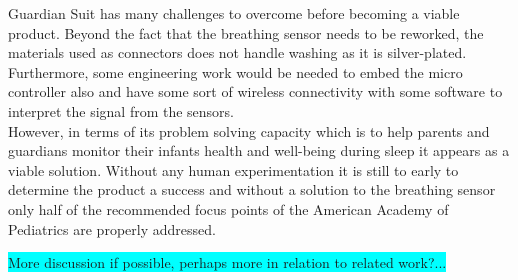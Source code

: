 \documentclass{sigchi-ext}
\begin{document}
Guardian Suit has many challenges to overcome before becoming a viable product. Beyond the fact that the breathing sensor needs
to be reworked, the materials used as connectors does not handle washing as it is silver-plated. Furthermore, some engineering
work would be needed to embed the micro controller also and have some sort of wireless connectivity with some software to interpret the
signal from the sensors. \\
However, in terms of its problem solving capacity which is to help parents and guardians monitor their infants health and well-being
during sleep it appears as a viable solution. Without any human experimentation it is still to early to determine the product a 
success and without a solution to the breathing sensor only half of the recommended focus points of the American Academy of Pediatrics
are properly addressed.

\colorbox{cyan}{More discussion if possible, perhaps more in relation to related work?...}









\balance{}



\end{document}
